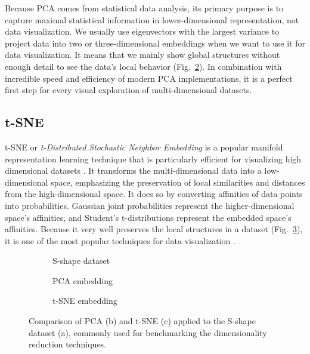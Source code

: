 Because PCA comes from statistical data analysis, its primary purpose is to capture maximal statistical information in lower-dimensional representation, not data visualization. We usually use eigenvectors with the largest variance to project data into two or three-dimensional embeddings when we want to use it for data visualization. It means that we mainly show global structures without enough detail to see the data's local behavior (Fig.~\ref{fig:pca-emb}). In combination with incredible speed and efficiency of modern PCA implementations, it is a perfect first step for every visual exploration of multi-dimensional datasets.

\subsection{t-SNE}
t-SNE or \textit{t-Distributed Stochastic Neighbor Embedding} \cite{vis:tsne} is a popular manifold representation learning technique that is particularly efficient for visualizing high dimensional datasets \cite{vis:repre-learning}. It transforms the multi-dimensional data into a low-dimensional space, emphasizing the preservation of local similarities and distances from the high-dimensional space. It does so by converting affinities of data points into probabilities. Gaussian joint probabilities represent the higher-dimensional space's affinities, and Student's t-distributions represent the embedded space's affinities. Because it very well preserves the local structures in a dataset (Fig.~\ref{fig:tsne}), it is one of the most popular techniques for data visualization \cite{vis:tsne-analysis}.
\begin{figure}[ht]
    \centering
    \begin{subfigure}[b]{0.33\textwidth}
        \centering
        
        \caption{S-shape dataset}
        \label{fig:s-shape-sub}
    \end{subfigure}
    \begin{subfigure}[b]{0.3\textwidth}
        \centering
        
        \caption{PCA embedding}
        \label{fig:pca-emb}
    \end{subfigure}
    \begin{subfigure}[b]{0.3\textwidth}
        \centering
        
        \caption{t-SNE embedding}
        \label{fig:tsne}
    \end{subfigure}
    
    \caption{Comparison of PCA (b) and t-SNE (c) applied to the S-shape dataset (a), commonly used for benchmarking the dimensionality reduction techniques.}
    \label{fig:s-shape}
\end{figure}

